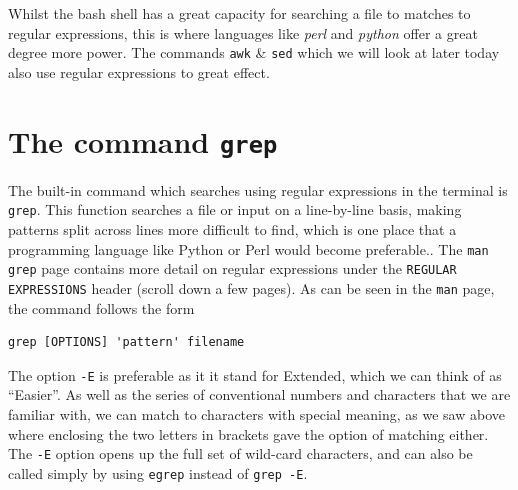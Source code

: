 \documentclass[a4paper,12pt,twoside]{memoir}
\begin{document}
Whilst the bash shell has a great capacity for searching a file to matches to regular expressions, this is where languages like \textit{perl} and \textit{python} offer a great degree more power.
The commands \texttt{awk} \& \texttt{sed} which we will look at later today also use regular expressions to great effect.

\section{The command \texttt{grep}}
The built-in command which searches using regular expressions in the terminal is \texttt{grep}.
This function searches a file or input on a line-by-line basis, making patterns split across lines more difficult to find, which is one place that a programming language like Python or Perl would become preferable..  
The \texttt{man grep} page contains more detail on regular expressions under the \texttt{REGULAR EXPRESSIONS} header (scroll down a few pages).  
As can be seen in the \texttt{man} page, the command follows the form
\begin{lstlisting}
grep [OPTIONS] 'pattern' filename
\end{lstlisting}
The option \texttt{-E} is preferable as it it stand for Extended, which we can think of as ``Easier''.
As well as the series of conventional numbers and characters that we are familiar with, we can match to characters with special meaning, as we saw above where enclosing the two letters in brackets gave the option of matching either. 
The \texttt{-E} option opens up the full set of wild-card characters, and can also be called simply by using \texttt{egrep} instead of \texttt{grep -E}.\\
\end{document}
